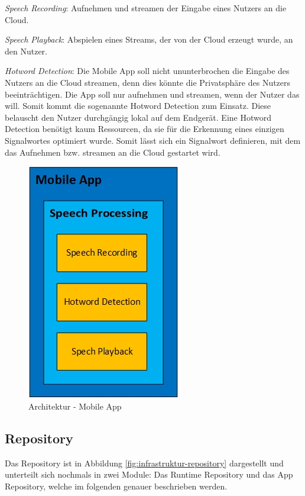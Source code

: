 \begin{description}
	\item \textit{Speech Recording}: Aufnehmen und streamen der Eingabe eines Nutzers an die Cloud.
	\item \textit{Speech Playback}: Abspielen eines Streams, der von der Cloud erzeugt wurde, an den Nutzer.
	\item \textit{Hotword Detection}: Die Mobile App soll nicht ununterbrochen die Eingabe des Nutzers an die Cloud streamen, denn dies könnte die Privatsphäre des Nutzers beeinträchtigen. Die App soll nur aufnehmen und streamen, wenn der Nutzer das will. Somit kommt die sogenannte \glqq Hotword Detection\grqq{} zum Einsatz. Diese belauscht den Nutzer durchgängig lokal auf dem Endgerät. Eine Hotword Detection benötigt kaum Ressourcen, da sie für die Erkennung eines einzigen Signalwortes optimiert wurde. Somit lässt sich ein Signalwort definieren, mit dem das Aufnehmen bzw. streamen an die Cloud gestartet wird. 
\end{description}

\begin{figure}[h!]
	\centering
	\includegraphics[width=0.3\linewidth]{Picture/Infrastruktur-App.jpg}
	\caption[Architektur - Mobile App]{Architektur - Mobile App}
	\label{fig:infrastruktur-app}
\end{figure}

\subsection{Repository}
Das Repository ist in Abbildung \ref{fig:infrastruktur-repository} dargestellt und unterteilt sich nochmals in zwei Module: Das Runtime Repository und das App Repository, welche im folgenden genauer beschrieben werden.


